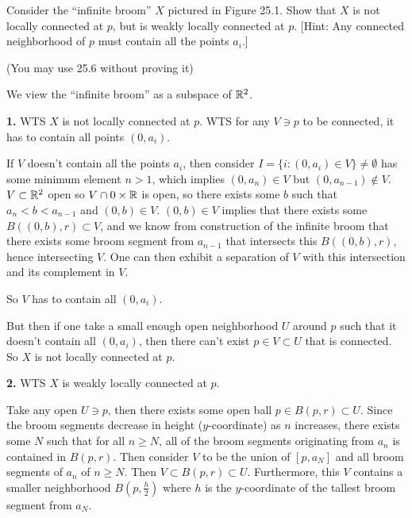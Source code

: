 \documentclass[a4paper, 10pt]{article}
\begin{document}
\begin{problem} [25.7 \done]
    Consider the ``infinite broom'' $X$ pictured in Figure 25.1. Show that $X$ is not locally connected at $p$, but is weakly locally connected at $p$. [Hint: Any connected neighborhood of $p$ must contain all the points $a_i$.]
    
    (You may use 25.6 without proving it)
\end{problem}
\begin{solution}
    We view the ``infinite broom'' as a subspace of $\mathbb{R}^2$.

    \textbf{1.} WTS $X$ is not locally connected at $p$. WTS for any $V \ni p$ to be connected, it has to contain all points $(0, a_i)$.
    
    If $V$ doesn't contain all the points $a_i$, then consider $I = \{i : (0, a_i) \in V\} \neq \emptyset$ has some minimum element $n > 1$, which implies $(0, a_{n}) \in V$ but $(0, a_{n-1}) \not \in V$. $V \subset \mathbb{R}^2$ open so $V \cap 0 \times \mathbb{R}$ is open, so there exists some $b$ such that $a_n < b < a_{n-1}$ and $(0, b) \in V$. $(0, b) \in V$ implies that there exists some $B((0, b), r) \subset V$, and we know from construction of the infinite broom that there exists some broom segment from $a_{n-1}$ that intersects this $B((0, b), r)$, hence intersecting $V$. One can then exhibit a separation of $V$ with this intersection and its complement in $V$.

    So $V$ has to contain all $(0, a_i)$.

    But then if one take a small enough open neighborhood $U$ around $p$ such that it doesn't contain all $(0, a_i)$, then there can't exist $p \in V \subset U$ that is connected.  So $X$ is not locally connected at $p$.

    \textbf{2.} WTS $X$ is weakly locally connected at $p$.

    Take any open $U \ni p$, then there exists some open ball $p \in B(p, r) \subset U$. Since the broom segments decrease in height ($y$-coordinate) as $n$ increases, there exists some $N$ such that for all $n \geq N$, all of the broom segments originating from $a_n$ is contained in $B(p, r)$. Then consider $V$ to be the union of $[p, a_N]$ and all broom segments of $a_n$ of $n \geq N$. Then $V \subset B(p, r) \subset U$. Furthermore, this $V$ contains a smaller neighborhood $B(p, \frac{h}{2})$ where $h$ is the $y$-coordinate of the tallest broom segment from $a_N$.
\end{solution}
\end{document}
